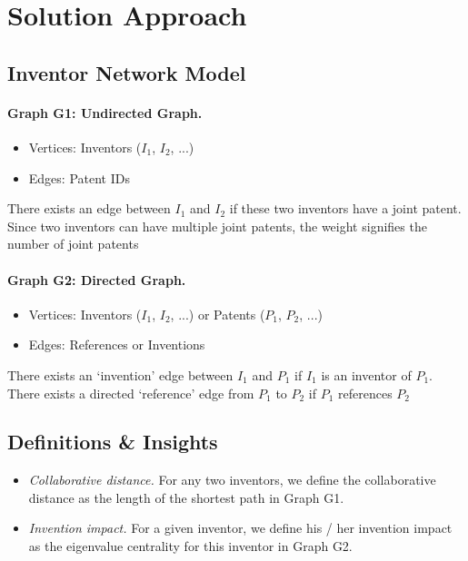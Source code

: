 \section{Solution Approach}

\subsection{Inventor Network Model}

\paragraph{Graph G1: Undirected Graph.}

	\begin{itemize}
		\item {Vertices:} Inventors  ($I_1$, $I_2$, ...)

		\item {Edges:} Patent IDs
	\end{itemize}

There exists an edge between $I_1$ and $I_2$ if these two inventors have a
joint patent. Since two inventors can have multiple joint patents, the weight
signifies the number of joint patents

\paragraph{Graph G2: Directed Graph.}

	\begin{itemize}
		\item {Vertices:} Inventors ($I_1$, $I_2$, ...) or Patents ($P_1$, $P_2$, ...)

		\item {Edges:} References or Inventions
	\end{itemize}

There exists an `invention' edge between $I_1$ and $P_1$ if $I_1$ is an inventor of $P_1$.
There exists a directed `reference' edge from $P_1$ to $P_2$ if $P_1$ references $P_2$

\subsection{Definitions \& Insights}

	\begin{itemize}
		\item {\em Collaborative distance.} For any two inventors, we define
		the collaborative distance as the length of the shortest path in
		Graph G1.

		\item {\em Invention impact.} For a given inventor, we define his /
		her invention impact as the eigenvalue centrality for this inventor
		in Graph G2.
	\end{itemize}

